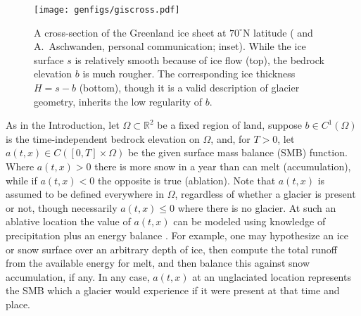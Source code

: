 \documentclass[hidelinks,onefignum,onetabnum,final]{siamart220329}  %
\newcommand{\RR}{\mathbb{R}}
\begin{document}
\begin{figure}[ht]
\centering
\texttt{[image: genfigs/giscross.pdf]}
\caption{A cross-section of the Greenland ice sheet at $70^\circ$N latitude (\cite{Morlighemetal2017} and A.~Aschwanden, personal communication; inset).  While the ice surface $s$ is relatively smooth because of ice flow (top), the bedrock elevation $b$ is much rougher.  The corresponding ice thickness $H = s-b$ (bottom), though it is a valid description of glacier geometry, inherits the low regularity of $b$.}
\label{fig:giscross}
\end{figure}

As in the Introduction, let $\Omega \subset \RR^2$ be a fixed region of land, suppose $b \in C^1(\Omega)$ is the time-independent bedrock elevation on $\Omega$, and, for $T>0$, let $a(t,x) \in C([0,T] \times \Omega)$ be the given surface mass balance (SMB) function.  Where $a(t,x)>0$ there is more snow in a year than can melt (accumulation), while if $a(t,x)<0$ the opposite is true (ablation).  Note that $a(t,x)$ is assumed to be defined everywhere in $\Omega$, regardless of whether a glacier is present or not, though necessarily $a(t,x) \le 0$ where there is no glacier.  At such an ablative location the value of $a(t,x)$ can be modeled using knowledge of precipitation plus an energy balance \cite{GreveBlatter2009}.  For example, one may hypothesize an ice or snow surface over an arbitrary depth of ice, then compute the total runoff from the available energy for melt, and then balance this against snow accumulation, if any.  In any case, $a(t,x)$ at an unglaciated location represents the SMB which a glacier would experience if it were present at that time and place.
\end{document}
